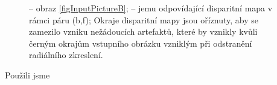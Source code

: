 \documentclass[11pt,oneside,a4paper,pdftex]{article}   %
\begin{document}
			\begin{figure}[htb]
					\centering

				\caption{ -- obraz \ref{figInputPictureB}; 
					 -- jemu odpovídající disparitní mapa v rámci páru
					(b,f);
					Okraje disparitní mapy jsou oříznuty, aby se zamezilo vzniku nežádoucích artefaktů,
					které by vznikly kvůli černým okrajům vstupního obrázku vzniklým při odstranění
					radiálního zkreslení.}
				\label{figSourcePictureAndDisparityMapForTheBFPair}
			\end{figure}
	


	
	Použili jsme \cite{Cech-BenCOS-CVPR-2007}
\end{document}
